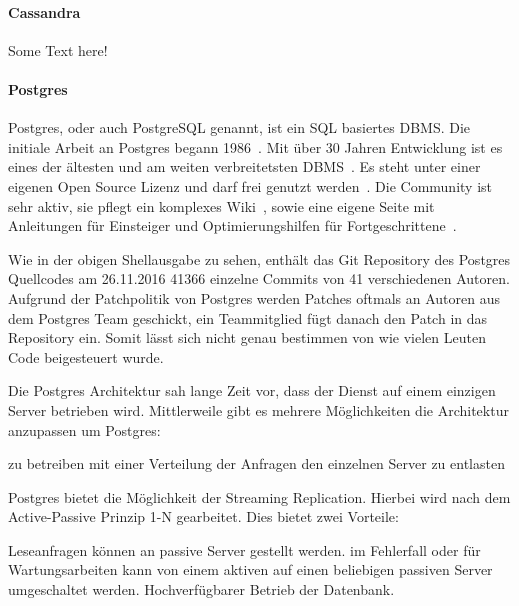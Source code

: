 \paragraph{Cassandra}
\label{paragraph:cassandra}
Some Text here!
\nl%

\paragraph{Postgres}
\label{paragraph:postgres}
Postgres, oder auch PostgreSQL genannt, ist ein \gls{SQL} basiertes \gls{DBMS}.
Die initiale Arbeit an Postgres begann 1986~\cite{old_postgres}. Mit über 30
Jahren Entwicklung ist es eines der ältesten und am weiten verbreitetsten
DBMS~\cite{db_ranking}. Es steht unter einer eigenen Open Source Lizenz und
darf frei genutzt werden~\cite{postgres_license}. Die Community ist sehr aktiv,
sie pflegt ein komplexes Wiki~\cite{postgres_wiki}, sowie eine eigene Seite mit
Anleitungen für Einsteiger und Optimierungshilfen für
Fortgeschrittene~\cite{postgres_tutorial}.



Wie in der obigen Shellausgabe zu sehen, enthält das \gls{Git} \gls{Repository}
des Postgres Quellcodes am 26.11.2016 41366 einzelne Commits von 41
verschiedenen Autoren. Aufgrund der Patchpolitik von Postgres werden Patches
oftmals an Autoren aus dem Postgres Team geschickt, ein Teammitglied fügt
danach den Patch in das Repository ein. Somit lässt sich nicht genau bestimmen
von wie vielen Leuten Code beigesteuert wurde.

Die Postgres Architektur sah lange Zeit vor, dass der Dienst auf einem einzigen
Server betrieben wird. Mittlerweile gibt es mehrere Möglichkeiten die
Architektur anzupassen um Postgres:

\begin{outline}
  \1  zu betreiben
  \1 
  \1 mit einer Verteilung der Anfragen den einzelnen Server zu entlasten
\end{outline}

Postgres bietet die Möglichkeit der \gls{Streaming Replication}. Hierbei wird
nach dem \gls{Active-Passive Prinzip} 1-N gearbeitet. Dies bietet zwei
Vorteile:

\begin{outline}
  \1 Leseanfragen können an passive Server gestellt werden.
  \1 im Fehlerfall oder für Wartungsarbeiten kann von einem aktiven auf einen
  beliebigen passiven Server umgeschaltet werden.
  \1 Hochverfügbarer Betrieb der Datenbank.
\end{outline}

